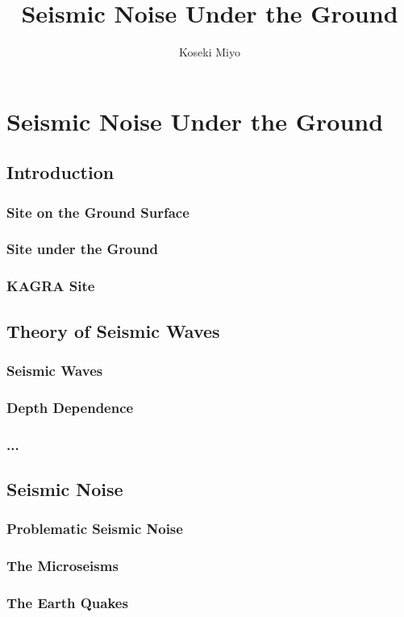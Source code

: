 \documentclass[a4paper,12pt]{book}
\title{Seismic Noise Under the Ground}
\author{Koseki Miyo}
\begin{document}
\setcounter{tocdepth}{2}
\maketitle

\tableofcontents

\chapter{Seismic Noise Under the Ground}
\section{Introduction}
\subsection{Site on the Ground Surface}
\subsection{Site under the Ground}
\subsection{KAGRA Site}
\section{Theory of Seismic Waves}
\subsection{Seismic Waves}
\subsection{Depth Dependence}
\subsection{...}
\section{Seismic Noise}
\subsection{Problematic Seismic Noise}
\subsection{The Microseisms}
\subsection{The Earth Quakes}
\end{document}
